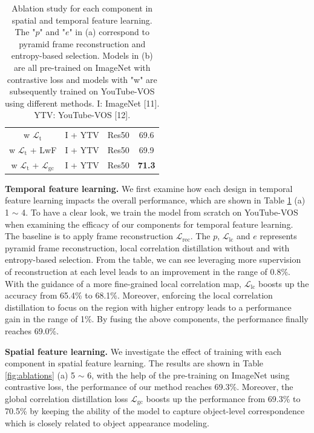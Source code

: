 \documentclass{article}
\begin{document}
\begin{table}[t]
{{\begin{tabular}{@{}cccc@{}}
            w $\mathcal{L}_{\mathrm{t}}$    & I + YTV & Res50 &69.6          \\
            w $\mathcal{L}_{\mathrm{t}}$ + LwF            & I + YTV & Res50 &69.9          \\
            w $\mathcal{L}_{\mathrm{t}}$ + $\mathcal{L}_{\mathrm{gc}}$ & I + YTV & Res50 &\textbf{71.3} \\ 
            \hline
            \end{tabular}%
            }
          }
    \captionsetup{font=small}
    \caption{Ablation study for each component in spatial and temporal feature learning.  The "$p$" and "$e$" in (a) correspond to pyramid frame reconstruction and entropy-based selection. Models in (b) are all pre-trained on ImageNet with contrastive loss and models with "w" are subsequently trained on YouTube-VOS using different methods. I: ImageNet [11].  YTV: YouTube-VOS [12].}
    \label{tab:ablations}\vspace{-3mm}
\end{table}

\textbf{Temporal feature learning.} We first examine how each design in temporal feature learning impacts the overall performance, which are shown in Table \ref{tab:ablations} (a) 1 $\sim$ 4. To have a clear look, we train the model from scratch on YouTube-VOS when examining the efficacy of our components for temporal feature learning. The baseline is to apply frame reconstruction $\mathcal{L}_{\mathrm{rec}}$. The $p$, $\mathcal{L}_{\mathrm{lc}}$ and $e$ represents pyramid frame reconstruction, local correlation distillation without and with entropy-based selection. From the table, we can see leveraging more supervision of reconstruction at each level leads to an improvement in the range of 0.8\%. With the guidance of a more fine-grained local correlation map, $\mathcal{L}_{\mathrm{lc}}$ boosts up the accuracy from 65.4\% to 68.1\%. Moreover, enforcing the local correlation distillation to focus on the region with higher entropy leads to a performance gain in the range of 1\%. By fusing the above components, the performance finally reaches 69.0\%.

\textbf{Spatial feature learning.} We investigate the effect of training with each component in spatial feature learning. The results are shown in Table \ref{fig:ablations} (a) 5 $\sim$ 6, with the help of the pre-training on ImageNet using contrastive loss, the performance of our method reaches 69.3\%. Moreover, the global correlation distillation loss $\mathcal{L}_{\mathrm{gc}}$ boosts up the performance from 69.3\% to 70.5\% by keeping the ability of the model to capture object-level correspondence which is closely related to object appearance modeling.
\end{document}
